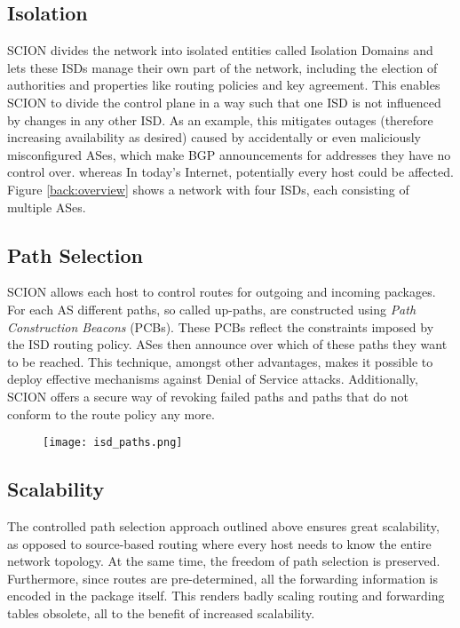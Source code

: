 \subsection{Isolation}
SCION divides the network into isolated entities called Isolation Domains and lets these ISDs manage their own part of the network, including the election of authorities and properties like routing policies and key agreement. This enables SCION to divide the control plane in a way such that one ISD is not influenced by changes in any other ISD. As an example, this mitigates outages (therefore increasing availability as desired) caused by accidentally or even maliciously misconfigured ASes, which make BGP announcements for addresses they have no control over. whereas In today's Internet, potentially every host could be affected. \cite[Chapter~3]{scion_book} Figure \ref{back:overview} shows a network with four ISDs, each consisting of multiple ASes.
	
\subsection{Path Selection}
SCION allows each host to control routes for outgoing and incoming packages. For each AS different paths, so called up-paths, are constructed using \textit{Path Construction Beacons} (PCBs). These PCBs reflect the constraints imposed by the ISD routing policy. ASes then announce over which of these paths they want to be reached. This technique, amongst other advantages, makes it possible to deploy effective mechanisms against Denial of Service attacks. Additionally, SCION offers a secure way of revoking failed paths and paths that do not conform to the route policy any more. \cite[Chapters~7, 10]{scion_book}
	
	\begin{figure}
		\centering
		\centerline{\texttt{[image: isd\_paths.png]}}
		\label{back:paths}
	\end{figure}

\subsection{Scalability}
The controlled path selection approach outlined above ensures great scalability, as opposed to source-based routing where every host needs to know the entire network topology. At the same time, the freedom of path selection is preserved. Furthermore, since routes are pre-determined, all the forwarding information is encoded in the package itself. This renders badly scaling routing and forwarding tables obsolete, all to the benefit of increased scalability. \cite{scion_book}


